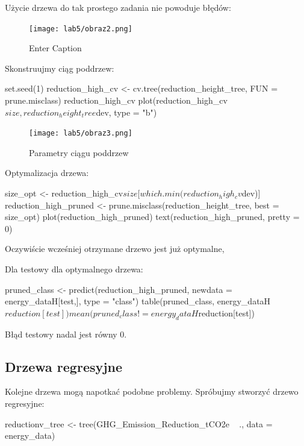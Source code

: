 Użycie drzewa do tak prostego zadania nie powoduje błędów:

\begin{figure}[H]
    \centering
    \texttt{[image: lab5/obraz2.png]}
    \caption{Enter Caption}
    \label{fig:enter-label}
\end{figure}

Skonstruujmy ciąg poddrzew:

\begin{Rcode}
set.seed(1)
reduction_high_cv <- cv.tree(reduction_height_tree, FUN = prune.misclass)
reduction_high_cv
plot(reduction_high_cv$size, reduction_height_tree$dev, type = "b")
\end{Rcode}

\begin{figure}[H]
    \centering
    \texttt{[image: lab5/obraz3.png]}
    \caption{Parametry ciągu poddrzew}
    \label{fig:enter-label}
\end{figure}

Optymalizacja drzewa:

\begin{Rcode}
size_opt <- reduction_high_cv$size[which.min(reduction_high_cv$dev)]
reduction_high_pruned <- prune.misclass(reduction_height_tree, best = size_opt)
plot(reduction_high_pruned)
text(reduction_high_pruned, pretty = 0)
\end{Rcode}

Oczywiście wcześniej otrzymane drzewo jest już optymalne,

Dla testowy dla optymalnego drzewa:

\begin{Rcode}
pruned_class <- predict(reduction_high_pruned, newdata = energy_dataH[test,], 
                        type = "class")
table(pruned_class, energy_dataH$reduction[test])
mean(pruned_class != energy_dataH$reduction[test])
\end{Rcode}

Błąd testowy nadal jest równy 0.

\subsection{Drzewa regresyjne}
Kolejne drzewa mogą napotkać podobne problemy. Spróbujmy stworzyć drzewo regresyjne:

\begin{Rcode}
reductionv_tree <- tree(GHG_Emission_Reduction_tCO2e ~ ., data = energy_data)
\end{Rcode}

